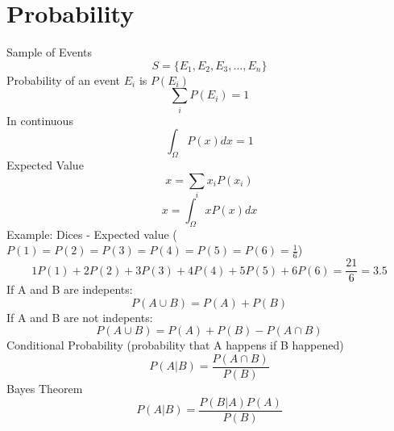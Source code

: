 \documentclass{article}
\begin{document}
\section{Probability}
Sample of Events
\begin{equation}
  S = \{E_1,E_2,E_3, \dots,E_n\}
\end{equation}
Probability of an event $E_i$ is $P(E_i)$
\begin{equation}
  \sum_i P(E_i) = 1
\end{equation}
In continuous
\begin{equation}
  \int_{\Omega} P(x) dx = 1
\end{equation}
Expected Value
\begin{equation}
  x = \sum_i x_i P(x_i)
\end{equation}
\begin{equation}
  x = \int_{\Omega}xP(x) dx
\end{equation}
Example: Dices - Expected value ($P(1) =P(2) = P(3) = P(4) = P(5) = P(6) = \frac{1}{6}$)
\begin{equation}
  1P(1) + 2P(2) + 3P(3) + 4P(4) + 5P(5) + 6P(6) = \frac{21}{6} = 3.5
\end{equation}
If A and B are indepents:
\begin{equation}
  P(A \cup B) = P(A) + P(B)
\end{equation}
If A and B are not indepents:
\begin{equation}
  P(A \cup B) = P(A) + P(B) - P(A\cap B)
\end{equation}
Conditional Probability (probability that A happens if B happened)
\begin{equation}
  P(A|B) = \frac{P(A\cap B)}{P(B)}
\end{equation}
Bayes Theorem
\begin{equation}
  P(A|B) = \frac{P(B|A)P(A)}{P(B)}
\end{equation}
\end{document}
